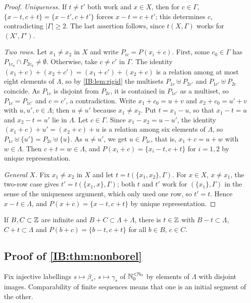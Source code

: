 \begin{proof}
\emph{Uniqueness.} If $t\neq t'$ both work and $x\in X$, then for $c\in\Gamma$,
$\{x-t,c+t\}=\{x-t',c+t'\}$ forces $x-t=c+t'$; this determines $c$, contradicting
$|\Gamma|\ge2$. The last assertion follows, since $t(X,\Gamma)$ works for $(X',\Gamma')$.

\emph{Two rows.} Let $x_1\ne x_2$ in $X$ and write $P_{ic}=P(x_i+c)$. First, some $c_0\in\Gamma$ has
$P_{1c_0}\cap P_{2c_0}\neq\emptyset$. Otherwise, take $c\ne c'$ in $\Gamma$. The identity
$(x_1+c)+(x_2+c')=(x_1+c')+(x_2+c)$ is a relation among at most eight elements of $\Lambda$, so by
\cref{IB:lem:rigid} the multisets $P_{1c}\uplus P_{2c'}$ and $P_{1c'}\uplus P_{2c}$ coincide. As
$P_{1c}$ is disjoint from $P_{2c}$, it is contained in $P_{1c'}$ as a multiset, so $P_{1c}=P_{1c'}$
and $c=c'$, a contradiction. Write $x_1+c_0=u+v$ and $x_2+c_0=u'+v$ with $u,u',v\in\Lambda$; then
$u\ne u'$ because $x_1\ne x_2$. Put $t=x_1-u$, so that $x_1-t=u$ and $x_2-t=u'$ lie in $\Lambda$.
Let $c\in\Gamma$. Since $x_1-x_2=u-u'$, the identity $(x_1+c)+u'=(x_2+c)+u$ is a relation among
six elements of $\Lambda$, so $P_{1c}\uplus\{u'\}=P_{2c}\uplus\{u\}$. As $u\ne u'$, we get $u\in P_{1c}$,
that is, $x_1+c=u+w$ with $w\in\Lambda$. Then $c+t=w\in\Lambda$, and $P(x_i+c)=\{x_i-t,c+t\}$ for
$i=1,2$ by unique representation.

\emph{General $X$.} Fix $x_1\ne x_2$ in $X$ and let $t=t(\{x_1,x_2\},\Gamma)$. For $x\in X$,
$x\neq x_1$, the two-row case gives $t'=t(\{x_1,x\},\Gamma)$; both $t$ and $t'$ work for
$(\{x_1\},\Gamma)$ in the sense of the uniqueness argument, which only used one row,
so $t'=t$. Hence $x-t\in\Lambda$, and $P(x+c)=\{x-t,c+t\}$ by unique representation.
\end{proof}

\begin{corollary}
\label{IB:cor:R}
If $B,C\subset\mathbb{Z}$ are infinite and $B+C\subset\Lambda+\Lambda$, there is $t\in\mathbb{Z}$ with $B-t\subset\Lambda$,
$C+t\subset\Lambda$ and $P(b+c)=\{b-t,c+t\}$ for all $b\in B$, $c\in C$.
\end{corollary}

\subsection{Proof of \texorpdfstring{\cref{IB:thm:nonborel}}{the non-Borel theorem}}

Fix injective labellings $s\mapsto\beta_s$, $s\mapsto\gamma_s$ of $\mathbb{N}_0^{<\mathbb{N}_0}$ by elements of $\Lambda$
with disjoint images. Comparability of finite sequences means that one is an
initial segment of the other.


